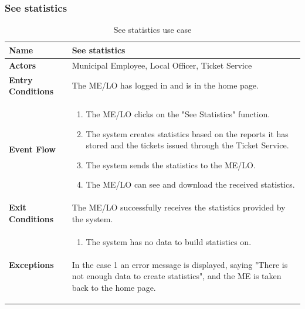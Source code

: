 					\subsubsection{See statistics}
					\begin{table}[!h]
						\centering
						\vspace{-4mm}
						\begin{tabular}{lp{}}
							\toprule
							\textbf{Name} & \textbf{See statistics} \\[1mm]
							\midrule
							\textbf{Actors} & Municipal Employee, Local Officer, Ticket Service \\[1mm]
							\textbf{Entry Conditions} & The ME/LO has logged in and is in the home page. \vspace{1mm}\\
							\textbf{Event Flow} &
							\vspace{-5mm} 
							\begin{enumerate}
								\setlength\itemsep{0.1mm}
								\item The ME/LO clicks on the "See Statistics" function.
								\item The system creates statistics based on the reports it has stored and the tickets issued through the Ticket Service.
								\item The system sends the statistics to the ME/LO.
								\item The ME/LO can see and download the received statistics.
							\end{enumerate} \\
							\textbf{Exit Conditions} & The ME/LO successfully receives the statistics provided by the system. \vspace{1mm}\\
							\textbf{Exceptions} & 
								\vspace{-5mm} 
								\begin{enumerate}
									\item The system has no data to build statistics on.
								\end{enumerate}
								\vspace{-7mm}
								\paragraph{}
									In the case 1 an error message is displayed, saying "There is not enough data to create statistics", and the ME is taken back to the home page.\\
							\bottomrule
						\end{tabular}
						\caption{See statistics use case}
					\end{table}
					
